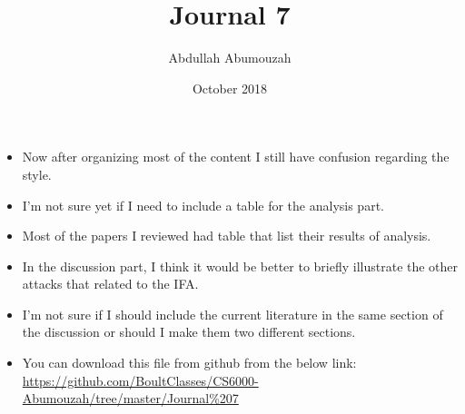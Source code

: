 \documentclass{article}
\title{Journal 7}
\author{Abdullah Abumouzah }
\date{October 2018}
\begin{document}
\maketitle


\begin{itemize}
    \item Now after organizing most of the content I still have confusion regarding the style.
    \item I'm not sure yet if I need to include a table for the analysis part. 
    \item Most of the papers I reviewed had table that list their results of analysis.
    \item In the discussion part, I think it would be better to briefly illustrate the other attacks  that related to the IFA.
    \item I'm not sure if I should include the current literature in the same section of the discussion or should I make them two different sections. 
    \item You can download this file from github from the below link: \url{https://github.com/BoultClasses/CS6000-Abumouzah/tree/master/Journal%207}
\end{itemize}
\end{document}
